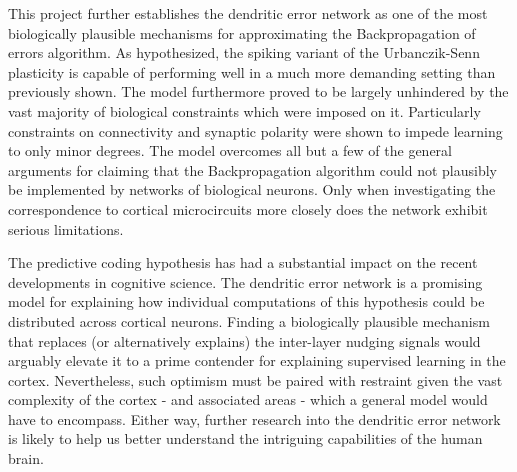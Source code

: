 This project further establishes the dendritic error network as one of the most biologically plausible mechanisms for
approximating the Backpropagation of errors algorithm. As hypothesized, the spiking variant of the Urbanczik-Senn
plasticity is capable of performing well in a much more demanding setting than previously shown. The model furthermore
proved to be largely unhindered by the vast majority of biological constraints which were imposed on it. Particularly
constraints on connectivity and synaptic polarity were shown to impede learning to only minor degrees. The model
overcomes all but a few of the general arguments for claiming that the Backpropagation algorithm could not plausibly be
implemented by networks of biological neurons. Only when investigating the correspondence to cortical microcircuits more
closely does the network exhibit serious limitations. 

The predictive coding hypothesis has had a substantial impact on the recent developments in cognitive science. The
dendritic error network is a promising model for explaining how individual computations of this hypothesis could be
distributed across cortical neurons. Finding a biologically plausible mechanism that replaces (or alternatively
explains) the inter-layer nudging signals would arguably elevate it to a prime contender for explaining supervised
learning in the cortex. Nevertheless, such optimism must be paired with restraint given the vast complexity of the
cortex - and associated areas - which a general model would have to encompass. Either way, further research into the
dendritic error network is likely to help us better understand the intriguing capabilities of the human brain.